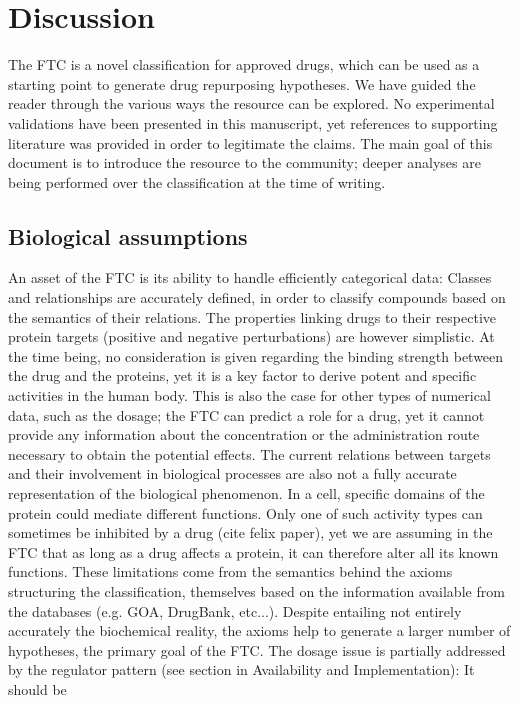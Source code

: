 \documentclass{bioinfo}
\begin{document}
\section{Discussion}

The FTC is a novel classification for approved drugs, which can be used as a starting point to 
generate drug repurposing hypotheses. We have guided the reader through the various ways the resource 
can be explored. No experimental validations have been presented in this manuscript, yet references to 
supporting literature was provided in order to legitimate the claims. The main goal of this document is to 
introduce the resource to the community; deeper analyses are being performed over the classification at the time of writing.

\subsection{Biological assumptions}
An asset of the FTC is its ability to handle efficiently categorical data: Classes and relationships 
are accurately defined, in order to classify compounds based on the semantics of their relations. The properties 
linking drugs to their respective protein targets (positive and negative perturbations) are however simplistic. At the 
time being, no consideration is given regarding the binding strength between the drug and the proteins, yet it is a key 
factor to derive potent and specific activities in the human body. This is also the case for other types of numerical data, 
such as the dosage; the FTC can predict a role for a drug, yet it cannot provide any information about the concentration or 
the administration route necessary to obtain the potential effects. The current relations between targets and their involvement 
in biological processes are also not a fully accurate representation of the biological phenomenon. In a cell, specific domains 
of the protein could mediate different functions. Only one of such activity types can sometimes be inhibited 
by a drug (cite felix paper), yet we are assuming in the FTC that as long as a drug affects a protein, 
it can therefore alter all its known functions.
These limitations come from the semantics behind the axioms structuring the classification, themselves based on the 
information available from the databases (e.g. GOA, DrugBank, etc...). Despite entailing not entirely accurately the 
biochemical reality, the axioms help to generate a larger number of hypotheses, the primary goal of the FTC. The dosage 
issue is partially addressed by the regulator pattern (see section in Availability and Implementation): It should be 
\end{document}

